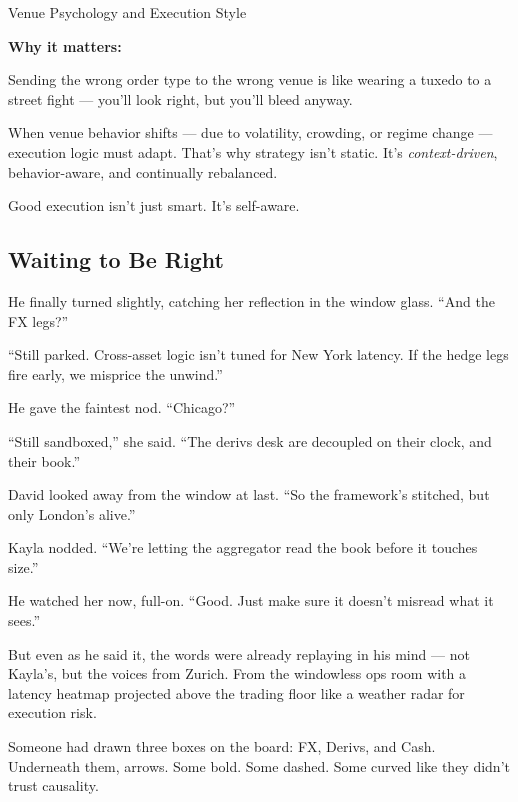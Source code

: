 \begin{TechnicalSidebar}{Venue Psychology and Execution Style}
\begin{itemize}
  \end{itemize}

  \medskip

  \textbf{Why it matters:}

  Sending the wrong order type to the wrong venue is like wearing a tuxedo to a street fight — you'll look right, but you’ll bleed anyway.

  \medskip

  When venue behavior shifts — due to volatility, crowding, or regime change — execution logic must adapt.  
  That’s why strategy isn’t static. It’s \textit{context-driven}, behavior-aware, and continually rebalanced.

  \medskip

  Good execution isn't just smart. It's self-aware.

\end{TechnicalSidebar}








\subsection{Waiting to Be Right}

He finally turned slightly, catching her reflection in the window glass.
“And the FX legs?”

“Still parked. Cross-asset logic isn’t tuned for New York latency. If the hedge legs fire early, we misprice the unwind.”

He gave the faintest nod.
“Chicago?”

“Still sandboxed,” she said. “The derivs desk are decoupled on their clock, and their book.”

David looked away from the window at last.
“So the framework’s stitched, but only London’s alive.”

Kayla nodded.
“We’re letting the aggregator read the book before it touches size.”

He watched her now, full-on.
“Good. Just make sure it doesn’t misread what it sees.”

But even as he said it, the words were already replaying in his mind —
not Kayla’s, but the voices from Zurich.
From the windowless ops room with a latency heatmap projected above the trading floor like a weather 
radar for execution risk.

Someone had drawn three boxes on the board: FX, Derivs, and Cash.
Underneath them, arrows. Some bold. Some dashed. Some curved like they didn’t trust causality.

